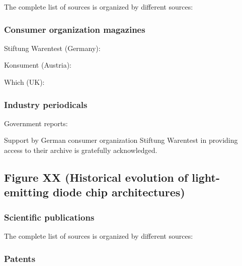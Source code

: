 \documentclass[10pt]{article}
\begin{document}
The complete list of sources is organized by different sources:

\subsubsection{Consumer organization magazines}

Stiftung Warentest (Germany): \cite{Warentest2008}\cite{Warentest2009_1}\cite{Warentest2009_2}\cite{Warentest2010_1}\cite{Warentest2010_2}\cite{Warentest2011}\cite{Warentest2012}\cite{Warentest2013}\cite{Warentest2014_1}\cite{Warentest2014_2}\cite{Warentest2015}\cite{Warentest2016_1}\cite{Warentest2016_2}\cite{Warentest2018}

Konsument (Austria): \cite{Konsument2010}

Which (UK): \cite{Which2020}

\subsubsection{Industry periodicals}

\cite{PM2020}

Government reports:

\cite{council2013assessment}

Support by German consumer organization Stiftung Warentest in providing access to their archive is gratefully acknowledged.

\subsection{Figure XX (Historical evolution of light-emitting diode chip architectures)}

\subsubsection{Scientific publications}

The complete list of sources is organized by different sources:

\cite{plossl2010wafer}\cite{bierhuizen2007performance}\cite{gencc2019distributed}\cite{chong2014performance}

\subsubsection{Patents}
\end{document}
